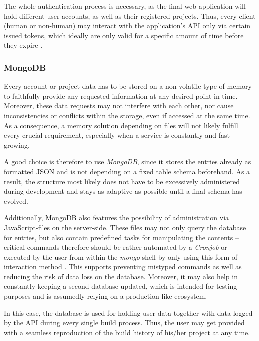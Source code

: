 The whole authentication process is necessary, as the final web application will hold different user accounts, as well as their registered projects. Thus, every client (human or non-human) may interact with the application's API only via certain issued tokens, which ideally are only valid for a specific amount of time before they expire \cite[43]{hardt2012oauth}.

\subsubsection{MongoDB}
Every account or project data has to be stored on a non-volatile type of memory to faithfully provide any requested information at any desired point in time. Moreover, these data requests may not interfere with each other, nor cause inconsistencies or conflicts within the storage, even if accessed at the same time. As a consequence, a memory solution depending on files will not likely fulfill every crucial requirement, especially when a service is constantly and fast growing.

A good choice is therefore to use \emph{MongoDB}, since it stores the entries already as formatted JSON and is not depending on a fixed table schema beforehand. As a result, the structure most likely does not have to be excessively administered during development and stays as adaptive as possible until a final schema has evolved.

Additionally, MongoDB also features the possibility of administration via
JavaScript-files on the server-side. These files may not only query the database for entries, but also contain predefined tasks for manipulating the contents -- critical commands therefore should be rather automated by a \emph{Cronjob} or executed by the user from within the \emph{mongo} shell by only using this form of interaction method \cite{MongoDBWritingScripts}. This supports preventing mistyped commands as well as reducing the risk of data loss on the database. Moreover, it may also help in constantly keeping a second database updated, which is intended for testing purposes and is assumedly relying on a production-like ecosystem.

In this case, the database is used for holding user data together with data logged by the API during every single build process. Thus, the user may get provided with a seamless reproduction of the build history of his/her project at any time.
